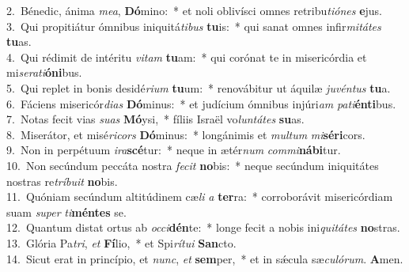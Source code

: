 {2.~}Bénedic, ánima \textit{me}\textit{a}, \textbf{Dó}mino:~* et noli oblivísci omnes retribu\textit{ti}\textit{ó}\textit{nes} \textbf{e}jus.\\
{3.~}Qui propitiátur ómnibus iniquitá\textit{ti}\textit{bus} \textbf{tu}is:~* qui sanat omnes infir\textit{mi}\textit{tá}\textit{tes} \textbf{tu}as.\\
{4.~}Qui rédimit de intéritu \textit{vi}\textit{tam} \textbf{tu}am:~* qui corónat te in misericórdia et mi\textit{se}\textit{ra}\textit{ti}\textbf{ó}\textbf{ni}bus.\\
{5.~}Qui replet in bonis desidé\textit{ri}\textit{um} \textbf{tu}um:~* renovábitur ut áquilæ \textit{ju}\textit{vén}\textit{tus} \textbf{tu}a.\\
{6.~}Fáciens misericór\textit{di}\textit{as} \textbf{Dó}minus:~* et judícium ómnibus injúri\textit{am} \textit{pa}\textit{ti}\textbf{én}\textbf{ti}bus.\\
{7.~}Notas fecit vias \textit{su}\textit{as} \textbf{Mó}ysi,~* fíliis Israël vo\textit{lun}\textit{tá}\textit{tes} \textbf{su}as.\\
{8.~}Miserátor, et misé\textit{ri}\textit{cors} \textbf{Dó}minus:~* longánimis et \textit{mul}\textit{tum} \textit{mi}\textbf{sé}\textbf{ri}cors.\\
{9.~}Non in perpétuum \textit{i}\textit{ra}\textbf{scé}tur:~* neque in ætér\textit{num} \textit{com}\textit{mi}\textbf{ná}\textbf{bi}tur.\\
{10.~}Non secúndum peccáta nostra \textit{fe}\textit{cit} \textbf{no}bis:~* neque secúndum iniquitátes nostras re\textit{trí}\textit{bu}\textit{it} \textbf{no}bis.\\
{11.~}Quóniam secúndum altitúdinem cæ\textit{li} \textit{a} \textbf{ter}ra:~* corroborávit misericórdiam suam \textit{su}\textit{per} \textit{ti}\textbf{mén}\textbf{tes} se.\\
{12.~}Quantum distat ortus ab \textit{oc}\textit{ci}\textbf{dén}te:~* longe fecit a nobis ini\textit{qui}\textit{tá}\textit{tes} \textbf{no}stras.\\
{13.~}Glória Pa\textit{tri}, \textit{et} \textbf{Fí}lio,~* et Spi\textit{rí}\textit{tu}\textit{i} \textbf{San}cto.\\
{14.~}Sicut erat in princípio, et \textit{nunc}, \textit{et} \textbf{sem}per,~* et in sǽcula sæ\textit{cu}\textit{ló}\textit{rum}. \textbf{A}men.\\
